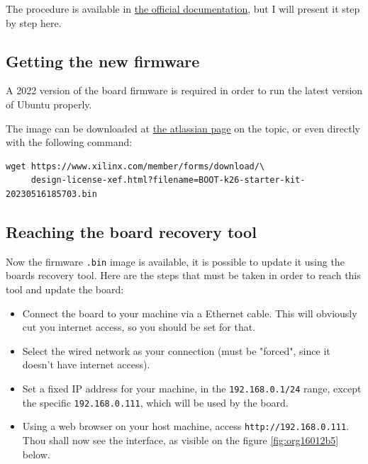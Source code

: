 \documentclass[10pt]{article}
\begin{document}
The procedure is available in \href{https://docs.xilinx.com/r/en-US/ug1089-kv260-starter-kit/Firmware-Update}{the official documentation},
but I will present it step by step here.

\subsection{Getting the new firmware}
\label{sec:orgf92b65e}
A 2022 version of the board firmware is required in order to run the latest
version of Ubuntu properly.

The image can be downloaded at \href{https://xilinx-wiki.atlassian.net/wiki/spaces/A/pages/1641152513/Kria+K26+ SOMoot-FW-update-with-xmutil}{the atlassian page} on the topic,
or even directly with the following command:

\begin{verbatim}
wget https://www.xilinx.com/member/forms/download/\
     design-license-xef.html?filename=BOOT-k26-starter-kit-20230516185703.bin
\end{verbatim}


\subsection{Reaching the board recovery tool}
\label{sec:org82a8b98}
Now the firmware \texttt{.bin} image is available, it is possible to update it using the
boards recovery tool. Here are the steps that must be taken in order to reach
this tool and update the board:

\begin{itemize}
\item Connect the board to your machine via a Ethernet cable.
This will obviously cut you internet access, so you should be set for that.
\item Select the wired network as your connection (must be "forced", since it
doesn't have internet access).
\item Set a fixed IP address for your machine, in the \texttt{192.168.0.1/24}
range, except the specific \texttt{192.168.0.111}, which will be used by the
board.
\item Using a web browser on your host machine, access
\texttt{http://192.168.0.111}. Thou shall now see the interface, as visible on
the figure \ref{fig:org16012b5} below.
\end{itemize}
\end{document}

